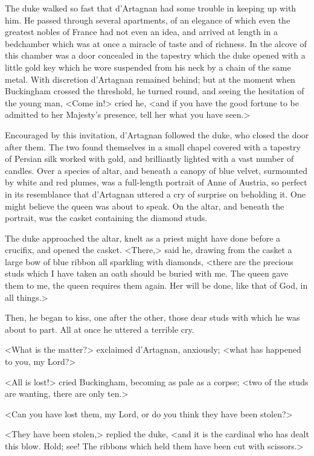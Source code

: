 The duke walked so fast that d'Artagnan had some trouble in keeping up with him. He passed through several apartments, of an elegance of which even the greatest nobles of France had not even an idea, and arrived at length in a bedchamber which was at once a miracle of taste and of richness. In the alcove of this chamber was a door concealed in the tapestry which the duke opened with a little gold key which he wore suspended from his neck by a chain of the same metal. With discretion d'Artagnan remained behind; but at the moment when Buckingham crossed the threshold, he turned round, and seeing the hesitation of the young man, <Come in!> cried he, <and if you have the good fortune to be admitted to her Majesty's presence, tell her what you have seen.> 

Encouraged by this invitation, d'Artagnan followed the duke, who closed the door after them. The two found themselves in a small chapel covered with a tapestry of Persian silk worked with gold, and brilliantly lighted with a vast number of candles. Over a species of altar, and beneath a canopy of blue velvet, surmounted by white and red plumes, was a full-length portrait of Anne of Austria, so perfect in its resemblance that d'Artagnan uttered a cry of surprise on beholding it. One might believe the queen was about to speak. On the altar, and beneath the portrait, was the casket containing the diamond studs. 

The duke approached the altar, knelt as a priest might have done before a crucifix, and opened the casket. <There,> said he, drawing from the casket a large bow of blue ribbon all sparkling with diamonds, <there are the precious studs which I have taken an oath should be buried with me. The queen gave them to me, the queen requires them again. Her will be done, like that of God, in all things.> 

Then, he began to kiss, one after the other, those dear studs with which he was about to part. All at once he uttered a terrible cry. 

<What is the matter?> exclaimed d'Artagnan, anxiously; <what has happened to you, my Lord?> 

<All is lost!> cried Buckingham, becoming as pale as a corpse; <two of the studs are wanting, there are only ten.> 

<Can you have lost them, my Lord, or do you think they have been stolen?> 

<They have been stolen,> replied the duke, <and it is the cardinal who has dealt this blow. Hold; see! The ribbons which held them have been cut with scissors.> 

